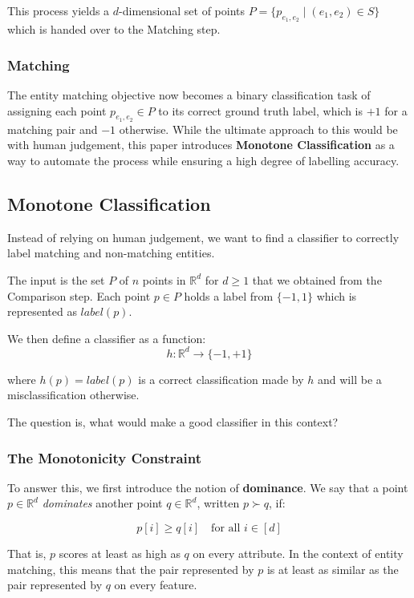 \documentclass[11pt, a4paper]{article}
\theoremstyle{boxed}
\newcommand{\R}{\mathbb{R}}
\begin{document}
This process yields a $d$-dimensional set of points $P = \{p_{e_1,e_2} \mid (e_1, e_2) \in S\}$ which is handed over to the Matching step.

\subsubsection{Matching}
The entity matching objective now becomes a binary classification task of assigning each point $p_{e_1,e_2} \in P$ to its correct ground truth label, which is $+1$ for a matching pair and $-1$ otherwise. While the ultimate approach to this would be with human judgement, this paper introduces \textbf{Monotone Classification} as a way to automate the process while ensuring a high degree of labelling accuracy.

\subsection{Monotone Classification}
Instead of relying on human judgement, we want to find a classifier to correctly label matching and non-matching entities.

The input is the set $P$ of $n$ points in $\R^{d}$ for $d \geq 1$ that we obtained from the Comparison step. Each point $p \in P$ holds a label from $\{-1, 1\}$ which is represented as $label(p)$.

We then define a classifier as a function:
$$ h : \R^{d} \rightarrow \{-1, +1\}$$

where $h(p) = label(p)$ is a correct classification made by $h$ and will be a misclassification otherwise.

The question is, what would make a good classifier in this context?

\subsubsection{The Monotonicity Constraint}
To answer this, we first introduce the notion of \textbf{dominance}.
We say that a point $p \in \mathbb{R}^d$ \textit{dominates} another point $q \in \mathbb{R}^d$, written $p \succ q$, if:

$$p[i] \geq q[i] \quad \text{for all } i \in [d]$$

That is, $p$ scores at least as high as $q$ on every attribute. In the context of entity matching, this means that the pair represented by $p$ is at least as similar as the pair represented by $q$ on every feature.
\end{document}
